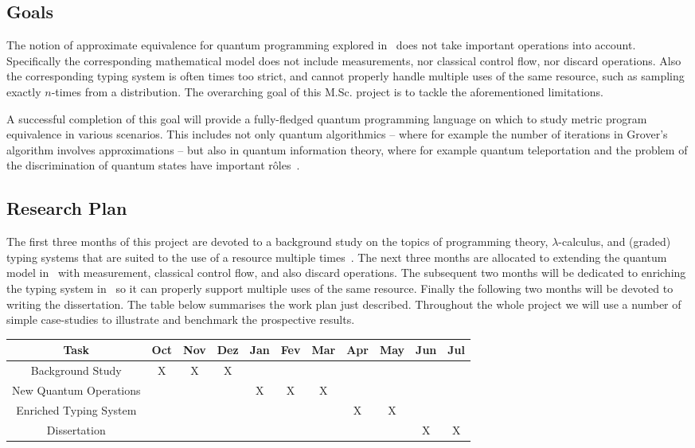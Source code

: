 \documentclass[a4paper, 11pt]{article}
\begin{document}
\subsection*{Goals}

The notion of approximate equivalence for quantum programming explored
in~\cite{dahlqvist23} does not take important operations into account.
Specifically the corresponding mathematical model does not include
measurements, nor classical control flow, nor discard operations. Also the
corresponding typing system is often times too strict, and cannot properly
handle multiple uses of the same resource, such as sampling exactly $n$-times
from a distribution.  The overarching goal of this M.Sc. project is to tackle
the aforementioned limitations.

A successful completion of this goal will provide a fully-fledged quantum
programming language on which to study metric program equivalence in various
scenarios. This includes not only quantum algorithmics -- where for example the
number of iterations in Grover's algorithm involves approximations -- but also
in quantum information theory, where for example quantum teleportation and the
problem of the discrimination of quantum states have important
rôles~\cite{nielsen_chuang_2010}.

\subsection*{Research Plan}

The first three months of this project are devoted to a background study on the
topics of programming theory, $\lambda$-calculus, and (graded) typing systems
that are suited to the use of a resource multiple
times~\cite{winskel93,dahlqvist23,dahlqvist23b}. The next three months are
allocated to extending the quantum model in~\cite{dahlqvist23} with
measurement, classical control flow, and also discard operations. The subsequent two
months will be dedicated to enriching the typing system in~\cite{dahlqvist23}
so it can properly support multiple uses of the same resource. Finally the
following two months will be devoted to writing the dissertation. The table below
summarises the work plan just described. Throughout the whole project we will
use a number of simple case-studies to illustrate and benchmark the prospective
results.

\begin{center}
\begin{tabular}{ | c | c | c | c | c | c | c | c | c | c | c | }
  \hline
  Task & Oct & Nov & Dez & Jan & Fev & Mar & Apr & May & Jun & Jul \\
  \hline
  Background Study & X & X & X & & & & & & & \\
  \hline
  New Quantum Operations  & & & & X  & X & X & & & & \\
  \hline
  Enriched Typing System & & & &  & & & X & X & & \\
  \hline
  Dissertation & & & &  & & & & & X & X \\
  \hline
\end{tabular}
\end{center}




\end{document}
